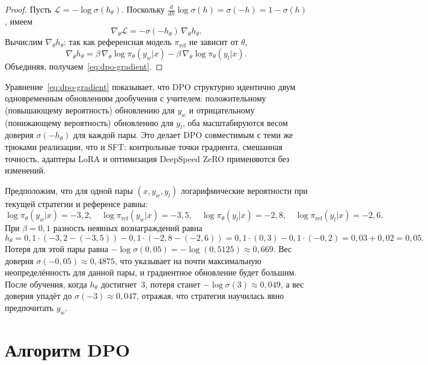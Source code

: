 \begin{proof}
Пусть $\mathcal{L} = -\log\sigma(h_\theta)$. Поскольку $\frac{d}{dh}\log\sigma(h) = \sigma(-h) = 1 - \sigma(h)$, имеем
\[
\nabla_\theta \mathcal{L} = -\sigma(-h_\theta)\,\nabla_\theta h_\theta.
\]
Вычислим $\nabla_\theta h_\theta$: так как референсная модель $\pi_\mathrm{ref}$ не зависит от $\theta$,
\[
\nabla_\theta h_\theta = \beta\,\nabla_\theta\log\pi_\theta(y_w|x) - \beta\,\nabla_\theta\log\pi_\theta(y_l|x).
\]
Объединяя, получаем~\eqref{eq:dpo-gradient}.
\end{proof}

\begin{remark}
\label{rem:dpo-sft}
Уравнение~\eqref{eq:dpo-gradient} показывает, что DPO структурно идентично двум одновременным обновлениям дообучения с учителем: положительному (повышающему вероятность) обновлению для $y_w$ и отрицательному (понижающему вероятность) обновлению для $y_l$, оба масштабируются весом доверия $\sigma(-h_\theta)$ для каждой пары. Это делает DPO совместимым с теми же трюками реализации, что и SFT: контрольные точки градиента, смешанная точность, адаптеры LoRA и оптимизация DeepSpeed ZeRO применяются без изменений.
\end{remark}

\begin{example}
\label{ex:dpo-computation}
Предположим, что для одной пары $(x, y_w, y_l)$ логарифмические вероятности при текущей стратегии и референсе равны:
\[
\log\pi_\theta(y_w|x) = -3{,}2, \quad \log\pi_\mathrm{ref}(y_w|x) = -3{,}5,
\quad \log\pi_\theta(y_l|x) = -2{,}8, \quad \log\pi_\mathrm{ref}(y_l|x) = -2{,}6.
\]
При $\beta = 0{,}1$ разность неявных вознаграждений равна
\[
h_\theta = 0{,}1\cdot(-3{,}2 - (-3{,}5)) - 0{,}1\cdot(-2{,}8 - (-2{,}6))
= 0{,}1\cdot(0{,}3) - 0{,}1\cdot(-0{,}2) = 0{,}03 + 0{,}02 = 0{,}05.
\]
Потеря для этой пары равна $-\log\sigma(0{,}05) = -\log(0{,}5125) \approx 0{,}669$. Вес доверия $\sigma(-0{,}05) \approx 0{,}4875$, что указывает на почти максимальную неопределённость для данной пары, и градиентное обновление будет большим. После обучения, когда $h_\theta$ достигнет~$3$, потеря станет $-\log\sigma(3) \approx 0{,}049$, а вес доверия упадёт до $\sigma(-3) \approx 0{,}047$, отражая, что стратегия научилась явно предпочитать $y_w$.
\end{example}

\section{Алгоритм DPO}
\label{sec:dpo-algorithm}

